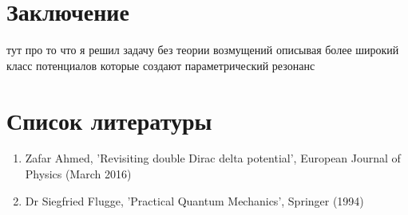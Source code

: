 \documentclass[11pt]{article}    %
\begin{document}
\section{Заключение}
{\color{red} тут про то что я решил задачу без теории возмущений описывая более широкий класс потенциалов которые создают параметрический резонанс}

\section{Список литературы}

   \begin{enumerate}
       \item Zafar Ahmed, 'Revisiting double Dirac delta potential', European Journal of Physics (March 2016)
       \item Dr Siegfried Flugge, 'Practical Quantum Mechanics', Springer (1994)
   \end{enumerate}

%
%
\end{document}
